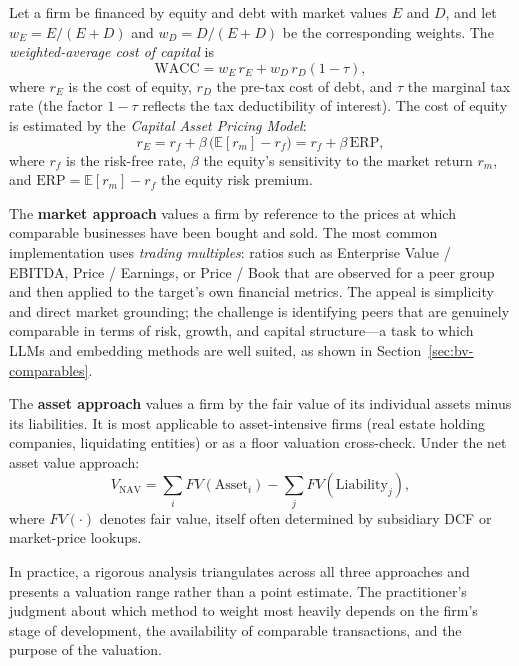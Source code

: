 \begin{context}
\begin{definition}
\label{def:wacc}
Let a firm be financed by equity and debt with market values $E$ and $D$, and let
$w_E = E/(E+D)$ and $w_D = D/(E+D)$ be the corresponding weights. The
\emph{weighted-average cost of capital} is
\begin{equation}
\label{eq:wacc}
\mathrm{WACC} = w_E\, r_E + w_D\, r_D (1-\tau),
\end{equation}
where $r_E$ is the cost of equity, $r_D$ the pre-tax cost of debt, and $\tau$ the
marginal tax rate (the factor $1-\tau$ reflects the tax deductibility of interest).
The cost of equity is estimated by the \emph{Capital Asset Pricing Model}:
\begin{equation}
\label{eq:capm}
r_E = r_f + \beta\,\bigl(\mathbb{E}[r_m] - r_f\bigr) = r_f + \beta\,\mathrm{ERP},
\end{equation}
where $r_f$ is the risk-free rate, $\beta$ the equity's sensitivity to the market
return $r_m$, and $\mathrm{ERP} = \mathbb{E}[r_m]-r_f$ the equity risk premium.
\end{definition}

The \textbf{market approach} values a firm by reference to the prices at which comparable
businesses have been bought and sold. The most common implementation uses \emph{trading
multiples}: ratios such as Enterprise Value / EBITDA, Price / Earnings, or Price /
Book that are observed for a peer group and then applied to the target's own financial
metrics. The appeal is simplicity and direct market grounding; the challenge is
identifying peers that are genuinely comparable in terms of risk, growth, and capital
structure---a task to which LLMs and embedding methods are well suited, as shown in
Section~\ref{sec:bv-comparables}.

The \textbf{asset approach} values a firm by the fair value of its individual assets
minus its liabilities. It is most applicable to asset-intensive firms (real estate
holding companies, liquidating entities) or as a floor valuation cross-check. Under the
net asset value approach:
\begin{equation}
\label{eq:nav}
V_{\mathrm{NAV}} = \sum_{i} FV(\mathrm{Asset}_i) - \sum_{j} FV(\mathrm{Liability}_j),
\end{equation}
where $FV(\cdot)$ denotes fair value, itself often determined by subsidiary DCF or
market-price lookups.

In practice, a rigorous analysis triangulates across all three approaches and presents
a valuation range rather than a point estimate. The practitioner's judgment about
which method to weight most heavily depends on the firm's stage of development,
the availability of comparable transactions, and the purpose of the valuation.


\end{context}

